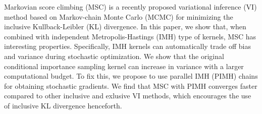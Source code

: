 
Markovian score climbing (MSC) is a recently proposed variational inference (VI) method based on Markov-chain Monte Carlo (MCMC) for minimizing the inclusive Kullback-Leibler (KL) divergence.
In this paper, we show that, when combined with independent Metropolis-Hastings (IMH) type of kernels, MSC has interesting properties.
Specifically, IMH kernels can automatically trade off bias and variance during stochastic optimization.
We show that the original conditional importance sampling kernel can increase in variance with a larger computational budget.
To fix this, we propose to use parallel IMH (PIMH) chains for obtaining stochastic gradients.
We find that MSC with PIMH converges faster compared to other inclusive and exlusive VI methods, which encourages the use of inclusive KL divergence henceforth.

